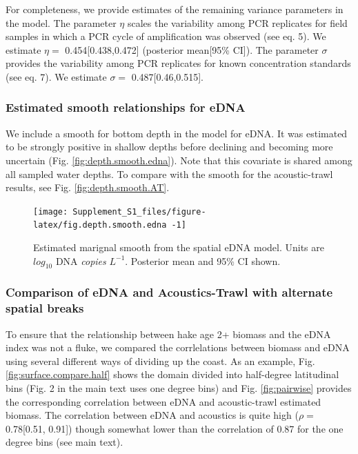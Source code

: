 \documentclass[
]{article}
\begin{document}
For completeness, we provide estimates of the remaining variance
parameters in the model. The parameter \(\eta\) scales the variability
among PCR replicates for field samples in which a PCR cycle of
amplification was observed (see eq. 5). We estimate \(\eta =\)
0.454{[}0.438,0.472{]} (posterior mean{[}95\% CI{]}). The parameter
\(\sigma\) provides the variability among PCR replicates for known
concentration standards (see eq. 7). We estimate \(\sigma=\)
0.487{[}0.46,0.515{]}.

\hypertarget{estimated-smooth-relationships-for-edna}{%
\subsubsection{Estimated smooth relationships for
eDNA}\label{estimated-smooth-relationships-for-edna}}

We include a smooth for bottom depth in the model for eDNA. It was
estimated to be strongly positive in shallow depths before declining and
becoming more uncertain (Fig. \ref{fig:depth.smooth.edna}). Note that
this covariate is shared among all sampled water depths. To compare with
the smooth for the acoustic-trawl results, see Fig.
\ref{fig:depth.smooth.AT}.

\begin{figure}
\texttt{[image: Supplement\_S1\_files/figure-latex/fig.depth.smooth.edna -1]} \caption{\label{fig:depth.smooth.edna} Estimated marignal smooth from the spatial eDNA model.  Units are \(log_{10}\) DNA \emph{copies} \(L^{-1}\).  Posterior mean and 95\% CI shown.}\label{fig:fig.depth.smooth.edna }
\end{figure}

\hypertarget{comparison-of-edna-and-acoustics-trawl-with-alternate-spatial-breaks}{%
\subsubsection{Comparison of eDNA and Acoustics-Trawl with alternate
spatial
breaks}\label{comparison-of-edna-and-acoustics-trawl-with-alternate-spatial-breaks}}

To ensure that the relationship between hake age 2+ biomass and the eDNA
index was not a fluke, we compared the corrlelations between biomass and
eDNA using several different ways of dividing up the coast. As an
example, Fig. \ref{fig:surface.compare.half} shows the domain divided
into half-degree latitudinal bins (Fig. 2 in the main text uses one
degree bins) and Fig. \ref{fig:pairwise} provides the corresponding
correlation between eDNA and acoustic-trawl estimated biomass. The
correlation between eDNA and acoustics is quite high (\(\rho =\)
0.78{[}0.51, 0.91{]}) though somewhat lower than the correlation of 0.87
for the one degree bins (see main text).
\end{document}
